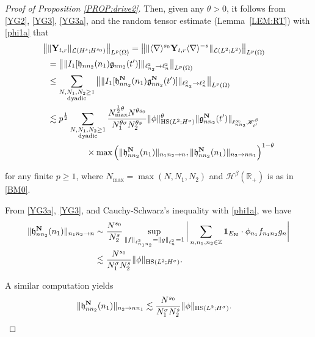 \documentclass[letterpaper, 11pt,  reqno]{amsart}
\DeclareMathOperator{\HS}{HS}
\newcommand{\1}{\hspace{0.5mm}\textup{I}\hspace{0.5mm}}
\newcommand{\noi}{\noindent}
\newcommand{\Z}{\mathbb{Z}}
\newcommand{\R}{\mathbb{R}}
\newcommand{\be}{\beta}
\newcommand{\nb}{\nabla}
\newcommand{\s}{\sigma}
\newcommand{\ta}{\theta}
\renewcommand{\l}{\ell}
\newcommand{\les}{\lesssim}
\newcommand{\jb}[1]
{\langle #1 \rangle}
\newcommand{\ind}{\mathbf 1}
\newcommand{\Hs}{\mathscr{H}}
\newcommand{\Om}{\Omega}
\newcommand{\LOP}{\mathcal{L}}
\newcommand{\YY}{\mathbf{Y}}
\newcommand{\hf}{\mathfrak{h}}
\newcommand{\ff}{\mathfrak{g}}
\numberwithin{equation}{section}
\numberwithin{theorem}{section}
\begin{document}
\begin{proof}[Proof of Proposition \ref{PROP:drive2}]
\noi
Then, given any $\ta > 0$, 
it follows from \eqref{YG2}, \eqref{YG3}, \eqref{YG3a}, 
and the random tensor estimate (Lemma~\ref{LEM:RT})
with \eqref{phi1a}
that 
\begin{align}
\begin{split}
 \big\| &  \| \YY_{t,r} \|_{\LOP(H^s;H^{s_0})} \big\|_{L^p(\Om)}
 = \big\| \| \jb{\nb}^{s_0}\YY_{t,r}\jb{\nb}^{-s} \|_{\LOP(L^2;L^2)} \big\|_{L^p(\Om)}\\
& = \big\| \| I_1[ \hf_{nn_2}(n_1) \ff_{nn_2}(t')  ] \|_{\l^2_{n_2} \to \l^2_n} \big\|_{L^p(\Om)}\\
& \le \sum_{\substack{N, N_1, N_2 \ge1 \\\text{dyadic}}}  
\big\| \| 
I_1[ \hf^{\bf N}_{nn_2}(n_1) \ff^{\bf N}_{nn_2}(t')] \|_{\l^2_{n_2} \to \l^2_n} \big\|_{L^p(\Om)}\\
& \les 
p^\frac 12 
\sum_{\substack{N, N_1, N_2 \ge1 \\\text{dyadic}}}  
\frac{N_{\max}^{\frac 12 \ta} N^{\ta s_0}}
{N_1^{ \ta\s} N_2^{\ta s}}
\|\phi\|_{\HS(L^2; H^\s)}^\ta
 \|  \ff^{\bf N}_{nn_2} (t')\|_{\l^\infty_{nn_2} \Hs_{t'}^\be}\\
& \hphantom{XXXXX}\times 
 \max\Big( \|  \hf^{\bf N}_{nn_2}(n_1)\|_{n_1n_2 \to n} , 
 \|   \hf^{\bf N}_{nn_2}(n_1) \|_{n_2 \to n n_1} \Big)^{1-\ta}
\end{split}
\label{YG3b}
\end{align}


\noi
for any finite $p \ge 1$, 
where 
 $N_{\max} = \max(N, N_1, N_2)$ and 
 $\Hs^\be(\R_+)$ is as in \eqref{BM0}. 



From \eqref{YG3a}, \eqref{YG3}, and 
Cauchy-Schwarz's inequality with \eqref{phi1a}, we have
\begin{align}
\begin{split}
\|  \hf^{\bf N}_{nn_2}(n_1)\|_{n_1n_2 \to n} 
&\sim 
\frac{N^{s_0}}{N_2^s}
\sup_{\|f\|_{\l^2_{n_1 n_2}}
= \|g\|_{\l^2_{n}}  = 1}
\bigg|
\sum_{n, n_1, n_2 \in \Z}
\ind_{E_{\bf N}}
\cdot 
\phi_{n_1} f_{n_1n_2} g_{n}\bigg|\\
&\les
\frac{N^{s_0}}{N_1^\s N_2^s}
\|\phi\|_{\HS(L^2; H^\s)}.
\end{split}
\label{YG3x}
\end{align}

\noi
A similar computation yields
\begin{align}
\begin{split}
\|  \hf^{\bf N}_{nn_2}(n_1)\|_{n_2 \to n n_1} 
&\les
\frac{N^{s_0}}{N_1^\s N_2^s}
\|\phi\|_{\HS(L^2; H^\s)}.
\end{split}
\label{YG3y}
\end{align}





\end{proof}
\end{document}
